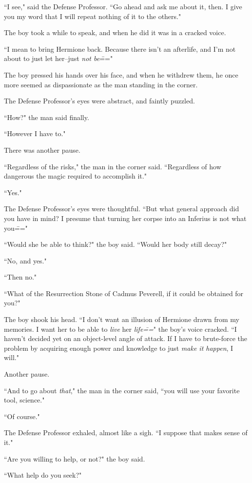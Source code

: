 ``I see," said the Defense Professor. ``Go ahead and ask me about it, then. I give you my word that I will repeat nothing of it to the others."

The boy took a while to speak, and when he did it was in a cracked voice.

``I mean to bring Hermione back. Because there isn't an afterlife, and I'm not about to just let her\---just \emph{not be}\==="

The boy pressed his hands over his face, and when he withdrew them, he once more seemed as dispassionate as the man standing in the corner.

The Defense Professor's eyes were abstract, and faintly puzzled.

``How?" the man said finally.

``However I have to."

There was another pause.

``Regardless of the risks," the man in the corner said. ``Regardless of how dangerous the magic required to accomplish it."

``Yes."

The Defense Professor's eyes were thoughtful. ``But what general approach did you have in mind? I presume that turning her corpse into an Inferius is not what you\==="

``Would she be able to think?" the boy said. ``Would her body still decay?"

``No, and yes."

``Then no."

``What of the Resurrection Stone of Cadmus Peverell, if it could be obtained for you?"

The boy shook his head. ``I don't want an illusion of Hermione drawn from my memories. I want her to be able to \emph{live} her \emph{life\===}" the boy's voice cracked. ``I haven't decided yet on an object-level angle of attack. If I have to brute-force the problem by acquiring enough power and knowledge to just \emph{make it happen}, I will."

Another pause.

``And to go about \emph{that}," the man in the corner said, ``you will use your favorite tool, science."

``Of course."

The Defense Professor exhaled, almost like a sigh. ``I suppose that makes sense of it."

``Are you willing to help, or not?" the boy said.

``What help do you seek?"

